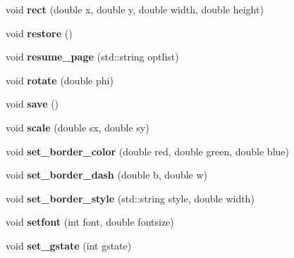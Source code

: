 \begin{DoxyCompactItemize}
\item 
\hypertarget{classPDFlib_a3c9ab4d05bd6b8716d311c05c91af04a}{void {\bfseries rect} (double x, double y, double width, double height)}\label{classPDFlib_a3c9ab4d05bd6b8716d311c05c91af04a}

\item 
\hypertarget{classPDFlib_a0e73e06c50b4adfe9bdf3d206b210442}{void {\bfseries restore} ()}\label{classPDFlib_a0e73e06c50b4adfe9bdf3d206b210442}

\item 
\hypertarget{classPDFlib_ae9ae4ec9f2162c582fbd35ff9092c497}{void {\bfseries resume\-\_\-page} (std\-::string optlist)}\label{classPDFlib_ae9ae4ec9f2162c582fbd35ff9092c497}

\item 
\hypertarget{classPDFlib_a083f84661e2c6ae1af089ac7f48b3897}{void {\bfseries rotate} (double phi)}\label{classPDFlib_a083f84661e2c6ae1af089ac7f48b3897}

\item 
\hypertarget{classPDFlib_a15c53a7de05f502273b2a9e977f0b91d}{void {\bfseries save} ()}\label{classPDFlib_a15c53a7de05f502273b2a9e977f0b91d}

\item 
\hypertarget{classPDFlib_a34c2b8df5a25b153402144788f5108cf}{void {\bfseries scale} (double sx, double sy)}\label{classPDFlib_a34c2b8df5a25b153402144788f5108cf}

\item 
\hypertarget{classPDFlib_ae32d8f048a4bcc36c4440e844685d83e}{void {\bfseries set\-\_\-border\-\_\-color} (double red, double green, double blue)}\label{classPDFlib_ae32d8f048a4bcc36c4440e844685d83e}

\item 
\hypertarget{classPDFlib_aaf02e71f9941ea7f615579cbd70b1d75}{void {\bfseries set\-\_\-border\-\_\-dash} (double b, double w)}\label{classPDFlib_aaf02e71f9941ea7f615579cbd70b1d75}

\item 
\hypertarget{classPDFlib_a0353836b9d1e47007aea5eb9573e4abf}{void {\bfseries set\-\_\-border\-\_\-style} (std\-::string style, double width)}\label{classPDFlib_a0353836b9d1e47007aea5eb9573e4abf}

\item 
\hypertarget{classPDFlib_a3454c94557adb7486abbad059bbe98f2}{void {\bfseries setfont} (int font, double fontsize)}\label{classPDFlib_a3454c94557adb7486abbad059bbe98f2}

\item 
\hypertarget{classPDFlib_ac40b1d868fb9430800c46667f49e16ff}{void {\bfseries set\-\_\-gstate} (int gstate)}\label{classPDFlib_ac40b1d868fb9430800c46667f49e16ff}


\end{DoxyCompactItemize}
